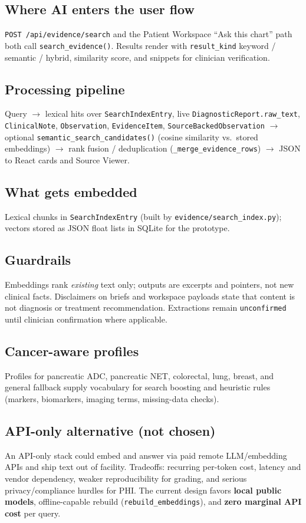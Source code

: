 \documentclass[11pt]{article}
\begin{document}
\subsection{Where AI enters the user flow}
\texttt{POST /api/evidence/search} and the Patient Workspace ``Ask this chart'' path both call \texttt{search\_evidence()}. Results render with \texttt{result\_kind} keyword / semantic / hybrid, similarity score, and snippets for clinician verification.

\subsection{Processing pipeline}
Query $\rightarrow$ lexical hits over \texttt{SearchIndexEntry}, live \texttt{DiagnosticReport.raw\_text}, \texttt{ClinicalNote}, \texttt{Observation}, \texttt{EvidenceItem}, \texttt{SourceBackedObservation} $\rightarrow$ optional \texttt{semantic\_search\_candidates()} (cosine similarity vs.\ stored embeddings) $\rightarrow$ rank fusion / deduplication (\texttt{\_merge\_evidence\_rows}) $\rightarrow$ JSON to React cards and Source Viewer.

\subsection{What gets embedded}
Lexical chunks in \texttt{SearchIndexEntry} (built by \texttt{evidence/search\_index.py}); vectors stored as JSON float lists in SQLite for the prototype.

\subsection{Guardrails}
Embeddings rank \emph{existing} text only; outputs are excerpts and pointers, not new clinical facts. Disclaimers on briefs and workspace payloads state that content is not diagnosis or treatment recommendation. Extractions remain \texttt{unconfirmed} until clinician confirmation where applicable.

\subsection{Cancer-aware profiles}
Profiles for pancreatic ADC, pancreatic NET, colorectal, lung, breast, and general fallback supply vocabulary for search boosting and heuristic rules (markers, biomarkers, imaging terms, missing-data checks).

\subsection{API-only alternative (not chosen)}
An API-only stack could embed and answer via paid remote LLM/embedding APIs and ship text out of facility. Tradeoffs: recurring per-token cost, latency and vendor dependency, weaker reproducibility for grading, and serious privacy/compliance hurdles for PHI. The current design favors \textbf{local public models}, offline-capable rebuild (\texttt{rebuild\_embeddings}), and \textbf{zero marginal API cost} per query.
\end{document}
